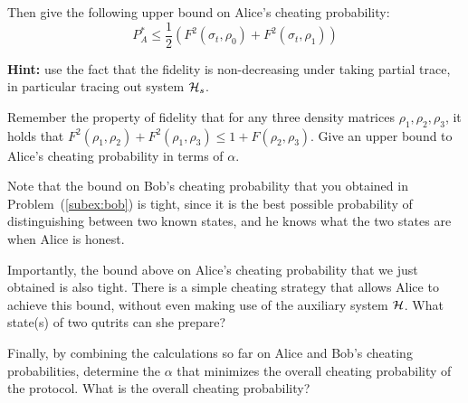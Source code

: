 \documentclass[a4paper,10pt,landscape,twocolumn]{scrartcl}
\begin{document}
\begin{exercise}
\begin{subex}
Then give the following upper bound on Alice's cheating probability:
\[
P_A^* \leq \frac12 \left( F^2(\sigma_t, \rho_0) + F^2(\sigma_t,\rho_1) \right)
\]

\textbf{Hint: } use the fact that the fidelity is non-decreasing under taking partial trace, in particular tracing out system $\mathcal{H}_s$.

\end{subex}

\begin{subex}
Remember the property of fidelity that for any three density matrices $\rho_1, \rho_2, \rho_3$, it holds that $F^2(\rho_1, \rho_2) + F^2(\rho_1, \rho_3) \leq 1 + F(\rho_2, \rho_3)$. Give an upper bound to Alice's cheating probability in terms of $\alpha$.
\end{subex}

\begin{subex}
Note that the bound on Bob's cheating probability that you obtained in Problem~(\ref{subex:bob}) is tight, since it is the best possible probability of distinguishing between two known states, and he knows what the two states are when Alice is honest. 

Importantly, the bound above on Alice's cheating probability that we just obtained is also tight. There is a simple cheating strategy that allows Alice to achieve this bound, without even making use of the auxiliary system $\mathcal{H}$. What state(s) of two qutrits can she prepare?
\end{subex}

\begin{subex}
Finally, by combining the calculations so far on Alice and Bob's cheating probabilities, determine the $\alpha$ that minimizes the overall cheating probability of the protocol. What is the overall cheating probability?
\end{subex}

\end{exercise}
\end{document}
